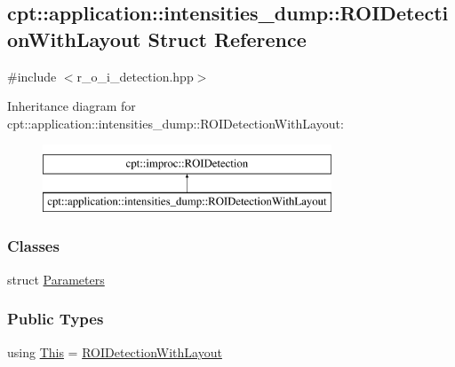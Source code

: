 \hypertarget{structcpt_1_1application_1_1intensities__dump_1_1_r_o_i_detection_with_layout}{\subsection{cpt\-:\-:application\-:\-:intensities\-\_\-dump\-:\-:R\-O\-I\-Detection\-With\-Layout Struct Reference}
\label{structcpt_1_1application_1_1intensities__dump_1_1_r_o_i_detection_with_layout}
}


{\ttfamily \#include $<$r\-\_\-o\-\_\-i\-\_\-detection.\-hpp$>$}

Inheritance diagram for cpt\-:\-:application\-:\-:intensities\-\_\-dump\-:\-:R\-O\-I\-Detection\-With\-Layout\-:\begin{figure}[H]
\begin{center}
\leavevmode
\includegraphics[height=2.000000cm]{structcpt_1_1application_1_1intensities__dump_1_1_r_o_i_detection_with_layout}
\end{center}
\end{figure}
\subsubsection*{Classes}
\begin{DoxyCompactItemize}
\item 
struct \hyperlink{structcpt_1_1application_1_1intensities__dump_1_1_r_o_i_detection_with_layout_1_1_parameters}{Parameters}
\end{DoxyCompactItemize}
\subsubsection*{Public Types}
\begin{DoxyCompactItemize}
\item 
using \hyperlink{structcpt_1_1application_1_1intensities__dump_1_1_r_o_i_detection_with_layout_a3ef4ded751300a297b16fc2e44a67e4e}{This} = \hyperlink{structcpt_1_1application_1_1intensities__dump_1_1_r_o_i_detection_with_layout}{R\-O\-I\-Detection\-With\-Layout}
\end{DoxyCompactItemize}
